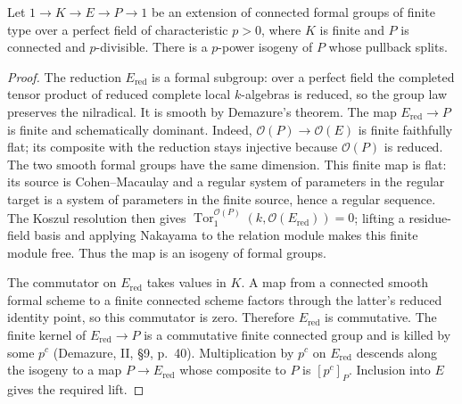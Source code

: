 \begin{lemma}
\label{C:formal-finite-kernel}
Let $1\to K\to E\to P\to1$ be an extension of connected formal
groups of finite type over a perfect field of characteristic $p>0$,
where $K$ is finite and $P$ is connected and $p$-divisible.
There is a $p$-power isogeny of $P$ whose pullback splits.
\end{lemma}
\begin{proof}
The reduction $E_{\mathrm{red}}$ is a formal subgroup: over a perfect
field the completed tensor product of reduced complete local
$k$-algebras is reduced, so the group law preserves the nilradical.
It is smooth by Demazure's theorem.  The map
$E_{\mathrm{red}}\to P$ is finite and schematically dominant.
Indeed, $\mathcal O(P)\to\mathcal O(E)$ is finite faithfully flat;
its composite with the reduction stays injective because
$\mathcal O(P)$ is reduced.  The two smooth formal groups have the
same dimension.  This finite map is flat: its source is
Cohen--Macaulay and a regular system of parameters in the regular
target is a system of parameters in the finite source, hence a regular
sequence.  The Koszul resolution then gives
$\operatorname{Tor}_1^{\mathcal O(P)}(k,\mathcal O(E_{\mathrm{red}}))=0$;
lifting a residue-field basis and applying Nakayama to the relation
module makes this finite module free.  Thus the map is an isogeny of
formal groups.

The commutator on $E_{\mathrm{red}}$ takes values in $K$.  A map from
a connected smooth formal scheme to a finite connected scheme factors
through the latter's reduced identity point, so this commutator is
zero.  Therefore $E_{\mathrm{red}}$ is commutative.  The finite kernel
of $E_{\mathrm{red}}\to P$ is a commutative finite connected group and
is killed by some $p^c$ (Demazure, II, \S9, p.~40).
Multiplication by $p^c$ on $E_{\mathrm{red}}$ descends along the isogeny
to a map $P\to E_{\mathrm{red}}$ whose composite to $P$ is
$[p^c]_P$.  Inclusion into $E$ gives the required lift.
\end{proof}

